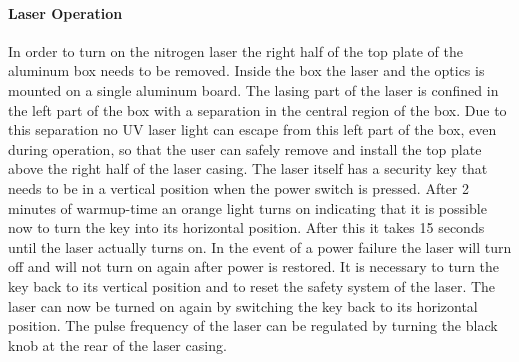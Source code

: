 \paragraph{Laser Operation} 
In order to turn on the nitrogen laser the right half of the top
plate of the aluminum box needs to be removed. Inside the box 
the laser and the optics is mounted on a single aluminum board.
The lasing part of the laser is confined in the left part of the box
with a separation in the central region of the box. Due to this separation
no UV laser light can escape from this left part of the box,
even during operation, so that the user can safely remove and install the
top plate above the right half of the laser casing.
The laser itself has a security key that needs 
to be in a vertical position when the power switch is pressed. After
2 minutes of warmup-time an orange light turns on indicating that
it is possible now to turn the key into its horizontal position.
After this it takes 15 seconds until the laser actually turns on.
In the event of a power failure the laser will turn off and will not
turn on again after power is restored. It is necessary to turn the key
back to its vertical position and to reset the safety system of the laser.
The laser can now be turned on again by switching the key back to its
horizontal position. The pulse frequency of the laser can be regulated by
turning the black knob at the rear of the laser casing.
